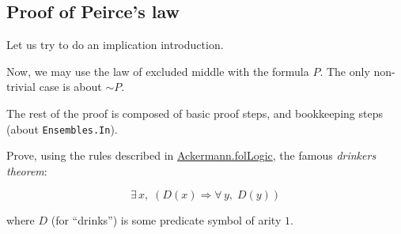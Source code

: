 

\subsection{Proof of Peirce's law}



Let us try to do an implication introduction.


Now, we may use the law of excluded middle with the formula $P$. The only non-trivial case is about $\sim P$.


The rest of the proof is composed of basic proof steps, 
and bookkeeping steps (about \texttt{Ensembles.In}).


\begin{exercise}
Prove, using the rules described in 
 \href{../theories/html/hydras.Ackermann.folLogic.html}{Ackermann.folLogic}, the famous \emph{drinkers theorem}:

$$\exists\,x,\; (D(x)\Longrightarrow \forall\,y,\; D(y))$$
\end{exercise}

where $D$ (for ``drinks'') is some predicate symbol of arity $1$.


